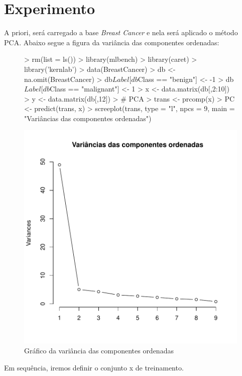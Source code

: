 \documentclass[12pt]{article}
\begin{document}
\section{Experimento}

 \par A priori, será carregado a base \textit{Breast Cancer} e nela será aplicado o método PCA. Abaixo segue a figura da variância das componentes ordenadas:

\begin{figure}
\centering
\begin{Schunk}
\begin{Sinput}
> rm(list = ls())
> library(mlbench)
> library(caret)
> library('kernlab')
> data(BreastCancer) 
> db <- na.omit(BreastCancer) 
> db$Label[db$Class == "benign"] <- -1
> db$Label[db$Class == "malignant"] <- 1
> x <- data.matrix(db[,2:10])
> y <- data.matrix(db[,12])
> # PCA
> trans <- prcomp(x)
> PC <- predict(trans, x)
> screeplot(trans, type = "l", npcs = 9, main = "Variâncias das componentes ordenadas")
\end{Sinput}
\end{Schunk}
\includegraphics{PCA-SVM-001}
\caption{Gráfico da variância das componentes ordenadas}
\label{1}
\end{figure} 

  \par Em sequência, iremos definir o conjunto x de treinamento. 
  
\end{document}
